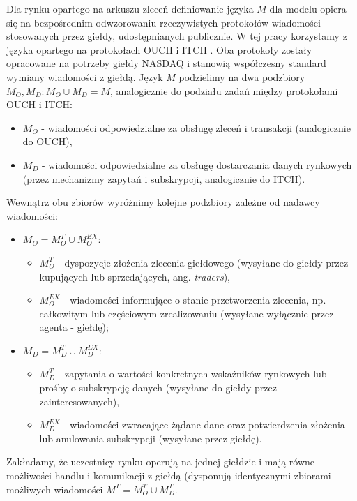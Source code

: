 Dla rynku opartego na arkuszu zleceń definiowanie języka $M$ dla modelu opiera się na bezpośrednim odwzorowaniu rzeczywistych protokołów wiadomości stosowanych przez giełdy, udostępnianych publicznie. W tej pracy korzystamy z języka opartego na protokołach OUCH \cite{ouch} i ITCH \cite{itch}. Oba protokoły zostały opracowane na potrzeby giełdy NASDAQ i stanowią współczesny standard wymiany wiadomości z giełdą. Język $M$ podzielimy na dwa podzbiory $M_O, M_D: M_O \cup M_D = M$, analogicznie do podziału zadań między protokołami OUCH i ITCH: 
\begin{itemize}
\item $M_O$ - wiadomości odpowiedzialne za obsługę zleceń i transakcji (analogicznie do OUCH),
\item $M_D$ - wiadomości odpowiedzialne za obsługę dostarczania danych rynkowych (przez mechanizmy zapytań i subskrypcji, analogicznie do ITCH).
\end{itemize}
Wewnątrz obu zbiorów wyróżnimy kolejne podzbiory zależne od nadawcy wiadomości: 
\begin{itemize}
\item $M_O = M^T_O \cup M^{EX}_O$: 
\begin{itemize}
\item $M^T_O$ - dyspozycje złożenia zlecenia giełdowego (wysyłane do giełdy przez kupujących lub sprzedających, ang. \textit{traders}), 
\item $M^{EX}_O$ - wiadomości informujące o stanie przetworzenia zlecenia, np. całkowitym lub częściowym zrealizowaniu (wysyłane wyłącznie przez agenta - giełdę); 
\end{itemize}
\item $M_D = M^T_D \cup M^{EX}_D$: 
\begin{itemize}
\item $M^T_D$ - zapytania o wartości konkretnych wskaźników rynkowych lub prośby o subskrypcję danych (wysyłane do giełdy przez zainteresowanych), \item$M^{EX}_D$ - wiadomości zwracające żądane dane oraz potwierdzenia złożenia lub anulowania subskrypcji (wysyłane przez giełdę). 
\end{itemize}
\end{itemize}
Zakładamy, że uczestnicy rynku operują na jednej giełdzie i mają równe możliwości handlu i komunikacji z giełdą (dysponują identycznymi zbiorami możliwych wiadomości $M^T = M^T_O \cup M^T_D$. 
